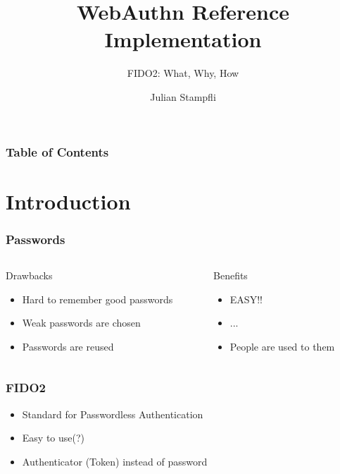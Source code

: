 \documentclass{beamer}
\begin{document}
\title{WebAuthn Reference Implementation}
\subtitle{FIDO2: What, Why, How}
\author{Julian Stampfli}

\frame{\titlepage}

\begin{frame}
  \frametitle{Table of Contents}
  \tableofcontents
\end{frame}

\section{Introduction}

\begin{frame}[fragile]
  \frametitle{Passwords}
  \begin{columns}
    \begin{column}{0.5\textwidth}
      Drawbacks
      \begin{itemize}
        \item Hard to remember good passwords
        \item Weak passwords are chosen
        \item Passwords are reused
      \end{itemize}
    \end{column}
    \pause
    \begin{column}{0.5\textwidth}
      Benefits
      \begin{itemize}
        \item EASY!!
        \item ...
        \pause
        \item People are used to them
      \end{itemize}
    \end{column}
  \end{columns}
\end{frame}

\begin{frame}[fragile]
  \frametitle{FIDO2}
  \begin{itemize}
    \item Standard for Passwordless Authentication
    \item Easy to use(?)
    \pause
    \item Authenticator (Token) instead of password
  \end{itemize}
\end{frame}
\end{document}
